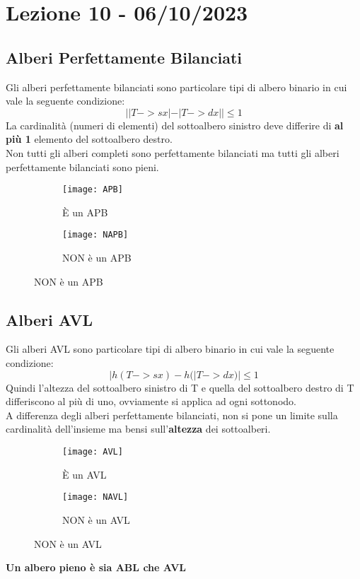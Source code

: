 \section{Lezione 10 - 06/10/2023}
\subsection{Alberi Perfettamente Bilanciati}
Gli alberi perfettamente bilanciati sono particolare tipi di albero binario in cui vale la seguente condizione:
$$ | |T->sx| - |T->dx| |  \le 1 $$ 
La cardinalità (numeri di elementi) del sottoalbero sinistro deve differire di \textbf{al più 1} elemento del sottoalbero destro.\\
Non tutti gli alberi completi sono perfettamente bilanciati ma tutti gli alberi perfettamente bilanciati sono pieni.

\begin{figure}[H]
    \centering
    \begin{subfigure}[b]{0.45\textwidth}
        \texttt{[image: APB]} 
        \caption{È un APB}
    \end{subfigure}
    \hfill
    \begin{subfigure}[b]{0.45\textwidth}
        \texttt{[image: NAPB]} 
        \caption{NON è un APB}
    \end{subfigure}
\end{figure}


\subsection{Alberi AVL}
Gli alberi AVL sono particolare tipi di albero binario in cui vale la seguente condizione:
$$ | h(T->sx) - h(|T->dx) |  \le 1 $$ 
Quindi l'altezza del sottoalbero sinistro di T e quella del sottoalbero destro di T differiscono al più di uno, ovviamente si applica ad ogni sottonodo.\\
A differenza degli alberi perfettamente bilanciati, non si pone un limite sulla cardinalità dell'insieme ma bensi sull'\textbf{altezza} dei sottoalberi.\\

\begin{figure}[H]
    \centering
    \begin{subfigure}[b]{0.45\textwidth}
        \texttt{[image: AVL]} 
        \caption{È un AVL}
    \end{subfigure}
    \hfill
    \begin{subfigure}[b]{0.45\textwidth}
        \texttt{[image: NAVL]} 
        \caption{NON è un AVL}
    \end{subfigure}
\end{figure}
\begin{center}
    \textbf{Un albero pieno è sia ABL che AVL}    
\end{center}

